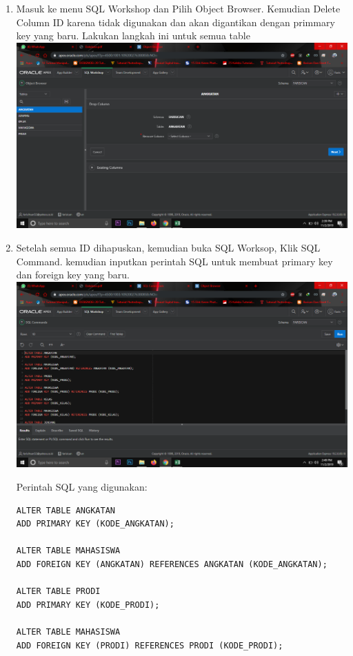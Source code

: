 \begin{enumerate}
\item Masuk ke menu SQL Workshop dan Pilih Object Browser. Kemudian Delete Column ID karena tidak digunakan dan akan digantikan dengan primmary key yang baru. Lakukan langkah ini untuk semua table\\
\includegraphics[scale = 0.3]{gambar/7.png}

\item Setelah semua ID dihapuskan, kemudian buka SQL Worksop, Klik SQL Command. kemudian inputkan perintah SQL untuk membuat primary key dan foreign key yang baru.\\
\includegraphics[scale = 0.3]{gambar/8.png}

Perintah SQL yang digunakan:\\
\begin{lstlisting}
ALTER TABLE ANGKATAN
ADD PRIMARY KEY (KODE_ANGKATAN);

ALTER TABLE MAHASISWA
ADD FOREIGN KEY (ANGKATAN) REFERENCES ANGKATAN (KODE_ANGKATAN);

ALTER TABLE PRODI
ADD PRIMARY KEY (KODE_PRODI);

ALTER TABLE MAHASISWA
ADD FOREIGN KEY (PRODI) REFERENCES PRODI (KODE_PRODI);


\end{lstlisting}
\end{enumerate}
